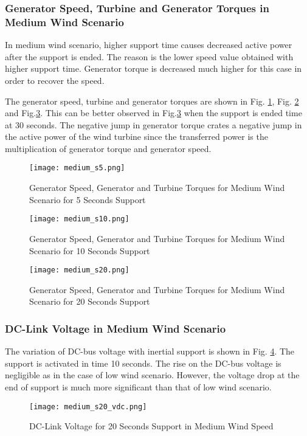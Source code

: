 \subsubsection{Generator Speed, Turbine and Generator Torques in Medium Wind Scenario}
In medium wind scenario, higher support time causes decreased active power after the support is ended. The reason is the lower speed value obtained with higher support time. Generator torque is decreased much higher for this case in order to recover the speed. \par
The generator speed, turbine and generator torques are shown in Fig. \ref{mid_torques1}, Fig. \ref{mid_torques2} and Fig.\ref{mid_torques3}. This can be better observed in Fig.\ref{mid_torques3} when the support is ended time at 30 seconds. The negative jump in generator torque crates a negative jump in the active power of the wind turbine since the transferred power is the multiplication of generator torque and generator speed.
\begin{figure}[h!]
	\centering
	\texttt{[image: medium\_s5.png]}
	\caption{Generator Speed, Generator and Turbine Torques for Medium Wind Scenario for 5 Seconds Support}
	\label{mid_torques1}
\end{figure}
\begin{figure}[h!]
	\centering
	\texttt{[image: medium\_s10.png]}
	\caption{Generator Speed, Generator and Turbine Torques for Medium Wind Scenario for 10 Seconds Support}
	\label{mid_torques2}
\end{figure}
\begin{figure}[h!]
	\centering
	\texttt{[image: medium\_s20.png]}
	\caption{Generator Speed, Generator and Turbine Torques for Medium Wind Scenario for 20 Seconds Support}
	\label{mid_torques3}
\end{figure}
\subsubsection{DC-Link Voltage in Medium Wind Scenario}
The variation of DC-bus voltage with inertial support is shown in Fig. \ref{med_vdc_s20}. The support is activated in time 10 seconds. The rise on the DC-bus voltage is negligible as in the case of low wind scenario. However, the voltage drop at the end of support is much more significant than that of low wind scenario. 
\begin{figure}[h!]
	\centering
	\texttt{[image: medium\_s20\_vdc.png]}
	\caption{DC-Link Voltage for 20 Seconds Support in Medium Wind Speed}
	\label{med_vdc_s20}
\end{figure}
